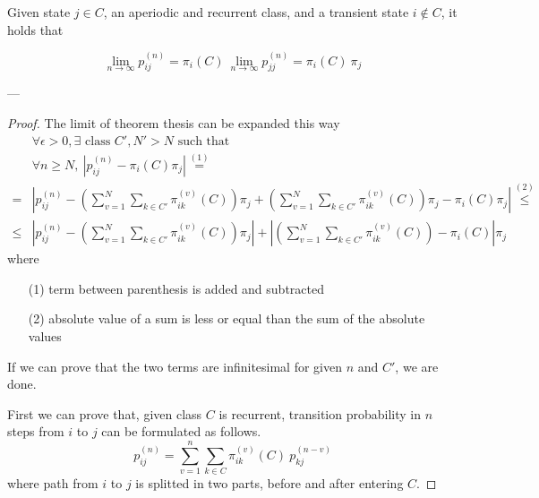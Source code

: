 	\begin{theorem}[3.1, KT p. 91] \label{th:3.1}
		Given state $j \in C$, an aperiodic and recurrent class, and a transient state $i \notin C$, it holds that

		$$ \lim_{n \to \infty } p_{ij}^{(n)} = \pi_i(C) ~ \lim_{n \to \infty } p_{jj}^{(n)} = \pi_i(C) ~ \pi_j $$
	\end{theorem}
	---
	\begin{proof}
		The limit of theorem thesis can be expanded this way
		\begin{equation}\begin{split} \label{eq:theorem_3.1_thesis}
			& \forall \epsilon > 0, \exists \text{ class } C', N'>N \text{ such that } \\
			& \forall n \ge N,~ \left| p_{ij}^{(n)} - \pi_i(C) \pi_j \right| \stackrel{(1)}{=} \\
			= & \left| p_{ij}^{(n)} - \left( \sum_{v = 1}^{N} \sum_{k \in C'} \pi_{ik}^{(v)}(C) \right) \pi_j +
				\left( \sum_{v = 1}^{N} \sum_{k \in C'} \pi_{ik}^{(v)}(C)\right)\pi_j - \pi_i(C)\pi_j \right| \stackrel{(2)}{\le} \\
			\le & \left| p_{ij}^{(n)} - \left( \sum_{v = 1}^{N} \sum_{k \in C'} \pi_{ik}^{(v)}(C) \right) \pi_j \right| +
				\left| \left( \sum_{v = 1}^{N} \sum_{k \in C'} \pi_{ik}^{(v)}(C)\right) - \pi_i(C) \right| \pi_j
		\end{split}\end{equation}
		where
		\begin{itemize}
			\item [(1)] term between parenthesis is added and subtracted
			\item [(2)] absolute value of a sum is less or equal than the sum of the absolute values
		\end{itemize}

		If we can prove that the two terms are infinitesimal for given $n$ and $C'$, we are done.
		\smallbreak

		First we can prove that, given class $C$ is recurrent, transition probability in $n$ steps from $i$ to $j$ can be formulated as follows.
		\begin{equation} \label{eq:n_step_in_class}
			p_{ij}^{(n)} = \sum_{v = 1}^{n} \sum_{k \in C} \pi_{ik}^{(v)}(C) ~ p_{kj}^{(n-v)}
		\end{equation}
		where path from $i$ to $j$ is splitted in two parts, before and after entering $C$.


\end{proof}
